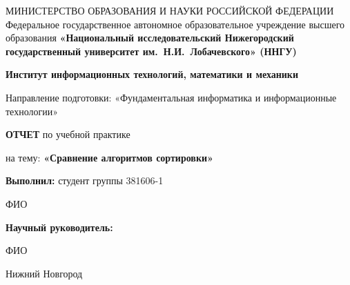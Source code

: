 \documentclass[12pt,a4paper]{article}
\begin{document}
{
\begin{titlepage}
  \begin{center}
    МИНИСТЕРСТВО ОБРАЗОВАНИЯ И НАУКИ РОССИЙСКОЙ ФЕДЕРАЦИИ\break
    Федеральное государственное автономное образовательное учреждение высшего образования\break
    \textbf{«Национальный исследовательский Нижегородский государственный университет им.~Н.И.~Лобачевского» (ННГУ)}
    \break

    \vspace*{1.25cm}

    \textbf{Институт информационных технологий, математики и механики}

    \vspace{0.5cm}

    Направление подготовки: «Фундаментальная информатика и информационные технологии»\break

    \vspace{2.5cm}

    \large{\textbf{ОТЧЕТ}}\break
    по учебной практике\break

    \vspace{0.25cm}

    на тему:\break
    \large{\textbf{«Сравнение алгоритмов сортировки»}}
  \end{center}

\vspace{2cm}

\hfill\textbf{Выполнил:} студент группы 381606-1

 \hfill ФИО

 \hfill\textbf{Научный руководитель:}

 \hfill ФИО
\vfill
\begin{center}
  Нижний Новгород
\end{center}
\end{titlepage}
}

\newpage
\tableofcontents
\newpage

\newpage

\newpage

\newpage

\newpage

\newpage




\newpage
% 
% 
\printbibliography[heading=bibintoc]

\newpage

\end{document}
